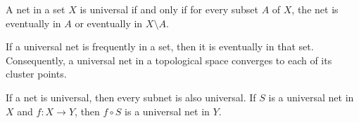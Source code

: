 A net in a set $X$ is universal if and only if for every subset $A$ of $X$, the net is eventually in $A$ or eventually in $X \setminus A$.

If a universal net is frequently in a set, then it is eventually in that set. Consequently, a universal net in a topological space converges to each of its cluster points.

If a net is universal, then every subnet is also universal. If $S$ is a universal net in $X$ and $f : X \to Y$, then $f \circ S$ is a universal net in $Y$.
